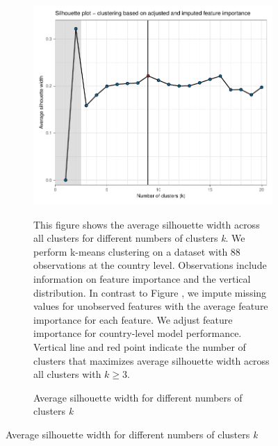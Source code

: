  \begin{figure}[ht!]\ContinuedFloat
   \centering
   \begin{subfigure}[b]{\textwidth}
   \centering
   \includegraphics{Figures_Appendix/Figure_Silhouette_3.pdf}
   \caption{Average silhouette width for different numbers of clusters \textit{k}} \label{fig:G1_silhouette_3}
   \begin{subcaption2}
     This figure shows the average silhouette width across all clusters for different numbers of clusters \textit{k}. We perform k-means clustering on a dataset with 88 observations at the country level. Observations include information on feature importance and the vertical distribution. In contrast to Figure , we impute missing values for unobserved features with the average feature importance for each feature. We adjust feature importance for country-level model performance. Vertical line and red point indicate the number of clusters that maximizes average silhouette width across all clusters with $k \geq 3$.
   \end{subcaption2}
   \end{subfigure}
 \end{figure}

 \clearpage

